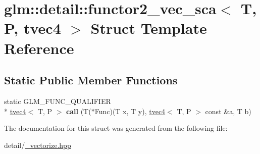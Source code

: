 \hypertarget{structglm_1_1detail_1_1functor2__vec__sca_3_01T_00_01P_00_01tvec4_01_4}{\section{glm\-:\-:detail\-:\-:functor2\-\_\-vec\-\_\-sca$<$ T, P, tvec4 $>$ Struct Template Reference}
\label{structglm_1_1detail_1_1functor2__vec__sca_3_01T_00_01P_00_01tvec4_01_4}
}
\subsection*{Static Public Member Functions}
\begin{DoxyCompactItemize}
\item 
\hypertarget{structglm_1_1detail_1_1functor2__vec__sca_3_01T_00_01P_00_01tvec4_01_4_ac8dcfe692f5b5d07ca805f981d58a913}{static G\-L\-M\-\_\-\-F\-U\-N\-C\-\_\-\-Q\-U\-A\-L\-I\-F\-I\-E\-R \\*
\hyperlink{structglm_1_1tvec4}{tvec4}$<$ T, P $>$ {\bfseries call} (T($\ast$Func)(T x, T y), \hyperlink{structglm_1_1tvec4}{tvec4}$<$ T, P $>$ const \&a, T b)}\label{structglm_1_1detail_1_1functor2__vec__sca_3_01T_00_01P_00_01tvec4_01_4_ac8dcfe692f5b5d07ca805f981d58a913}

\end{DoxyCompactItemize}


The documentation for this struct was generated from the following file\-:\begin{DoxyCompactItemize}
\item 
detail/\hyperlink{__vectorize_8hpp}{\-\_\-vectorize.\-hpp}\end{DoxyCompactItemize}
